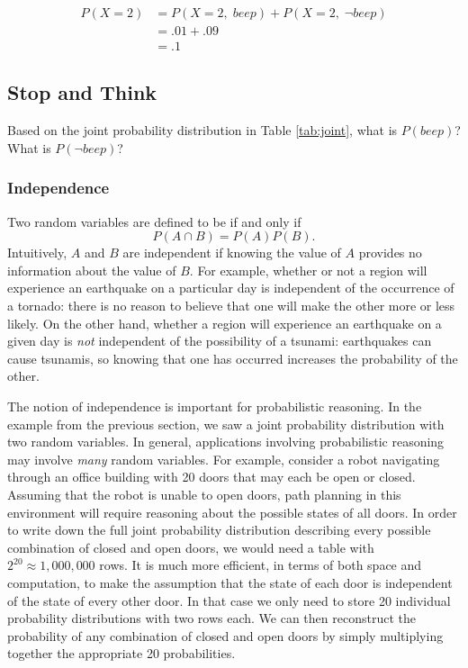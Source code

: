 \[
\begin{split}
  P(X=2) & = P(X=2,\; beep) +  P(X=2,\; \lnot beep) \\
  & = .01 + .09 \\
  & = .1 
  \end{split}
\]

\subsection*{Stop and Think}

\begin{exercise}
Based on the joint probability distribution in Table \ref{tab:joint}, what is
$P(beep)$? What is $P(\lnot beep)$?
\end{exercise}


\subsubsection{Independence}
\label{sec:independence}
Two random variables are defined to be  if and
only if
\begin{equation}
  P(A \cap B) = P(A)P(B).
\end{equation}
Intuitively, $A$ and $B$ are independent if knowing the value of $A$
 provides no information about the value of $B$.  For example,
whether or not a region will experience an earthquake on a particular
day is independent of the occurrence of a tornado: there is no reason
to believe that one will make the other more or less likely.  On the
other hand, whether a region will experience an earthquake on a given
day is \emph{not} independent of the possibility of a tsunami:
earthquakes can cause tsunamis, so knowing that one has occurred
increases the probability of the other.

The notion of independence is important for probabilistic
reasoning. In the example from the previous section, we saw a joint
probability distribution with two random variables.  In general,
applications involving probabilistic reasoning may involve \emph{many}
random variables. For example, consider a robot navigating through an
office building with 20 doors that may each be open or closed.
Assuming that the robot is unable to open doors, path planning in this
environment will require reasoning about the possible states of all
doors. In order to write down the full joint probability distribution
describing every possible combination of closed and open doors, we
would need a table with $2^{20}\approx 1,000,000$ rows. It is much
more efficient, in terms of both space and computation, to make the
assumption that the state of each door is independent of the state of
every other door. In that case we only need to store 20 individual
probability distributions with two rows each.  We can then reconstruct
the probability of any combination of closed and open doors by simply
multiplying together the appropriate 20 probabilities.

